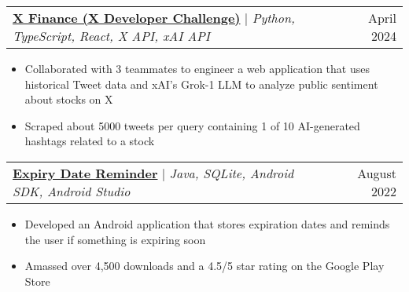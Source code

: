 \documentclass[letterpaper,11pt]{article}
\makeatletter
\newcommand{\resumeItem}[1]{
  \item\small{
    {#1 \vspace{-2pt}}
  }
}
\newcommand{\resumeProjectHeading}[2]{
    \item
    \begin{tabular*}{0.97\textwidth}{l@{\extracolsep{\fill}}r}
      \small#1 & #2 \\
    \end{tabular*}\vspace{-7pt}
}
\newcommand{\resumeItemListStart}{\begin{itemize}}
\newcommand{\resumeItemListEnd}{\end{itemize}\vspace{-5pt}}
\makeatother
\begin{document}
  \resumeProjectHeading
    {\href{https://github.com/anish-sahoo/XDevChallenge}{\textbf{X Finance (X Developer Challenge)}} $|$ \emph{Python, TypeScript, React, X API, xAI API}}{April 2024}
    \resumeItemListStart
      \resumeItem{Collaborated with 3 teammates to engineer a web application that uses historical Tweet data and xAI's Grok-1 LLM to analyze public sentiment about stocks on X}
      \resumeItem{Scraped about 5000 tweets per query containing 1 of 10 AI-generated hashtags related to a stock}
    \resumeItemListEnd

    


  \resumeProjectHeading
    {\href{https://play.google.com/store/apps/details?id=com.anish.expirydatereminder}{\textbf{Expiry Date Reminder}} $|$ \emph{Java, SQLite, Android SDK, Android Studio}}{August 2022}
    \resumeItemListStart
      \resumeItem{Developed an Android application that stores expiration dates and reminds the user if something is expiring soon}
      \resumeItem{Amassed over 4,500 downloads and a 4.5/5 star rating on the Google Play Store}
    \resumeItemListEnd

  
\end{document}
